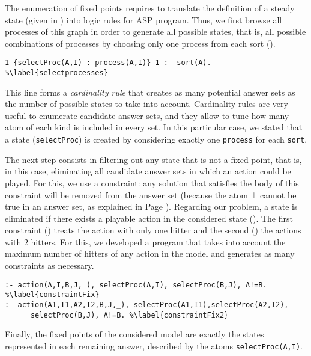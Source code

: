 The enumeration of fixed points requires to translate the definition of a steady state (given in )
into logic rules for ASP program. Thus, we first browse all processes of this graph in order to generate all possible states,
that is, all possible combinations of processes by choosing only one process from each sort ().
\begin{lstlisting}
1 {selectProc(A,I) : process(A,I)} 1 :- sort(A). %\label{selectprocesses}
\end{lstlisting}
This line forms a \emph{cardinality rule} that creates as many potential answer sets as the number of possible states
to take into account.
Cardinality rules are very useful to enumerate candidate answer sets,
and they allow to tune how many atom of each kind is included in every set.
In this particular case, we stated that a state (\texttt{selectProc})
is created by considering exactly one \texttt{process} for each \texttt{sort}.

The next step consists in filtering out any state that is not a fixed point,
that is, in this case, eliminating all candidate answer sets in which an action could be played. For this, we use a constraint:
any solution that satisfies the body of this constraint will be removed from the answer set (because the atom $\bot$ cannot be true in an answer set, as explained in Page \pageref{constraint}).
Regarding our problem, a state is eliminated if there exists a playable action in the considered state (). The first constraint () treats the action with only one hitter and the second () the actions with $2$ hitters. For this, we developed a program that takes into account the maximum number of hitters of any action in the model and generates as many constraints as necessary.
\begin{lstlisting}
:- action(A,I,B,J,_), selectProc(A,I), selectProc(B,J), A!=B. %\label{constraintFix}
:- action(A1,I1,A2,I2,B,J,_), selectProc(A1,I1),selectProc(A2,I2), 
      selectProc(B,J), A!=B. %\label{constraintFix2}
\end{lstlisting}
Finally, the fixed points of the considered model are exactly the states represented in each remaining answer,
described by the atoms \texttt{selectProc(A,I)}.

